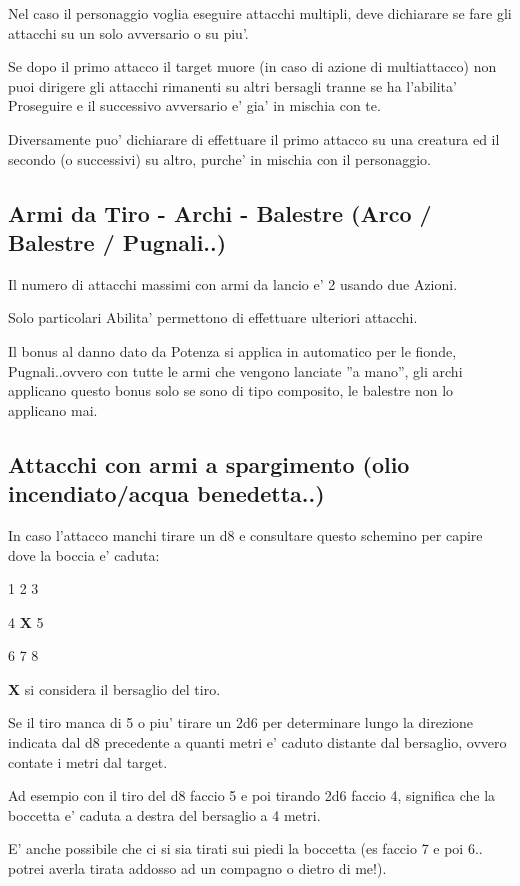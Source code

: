 \documentclass[a4paper,11pt,twoside,openany]{book}
\begin{document}
	Nel caso il personaggio voglia eseguire attacchi multipli, deve dichiarare se fare gli attacchi su un solo avversario o su piu'.
	
	Se dopo il primo attacco il target muore (in caso di azione di multiattacco) non puoi dirigere gli attacchi rimanenti su altri bersagli tranne se ha l'abilita' Proseguire e il successivo avversario e' gia' in mischia con te.
	
	Diversamente puo' dichiarare di effettuare il primo attacco su una creatura ed il secondo (o successivi) su altro, purche' in mischia con il personaggio.
	
	\subsection{Armi da Tiro - Archi - Balestre (Arco / Balestre / Pugnali..)}
	
	Il numero di attacchi massimi con armi da lancio e' 2 usando due Azioni.
	
	Solo particolari Abilita' permettono di effettuare ulteriori attacchi.
	
	Il bonus al danno dato da Potenza si applica in automatico per le fionde, Pugnali..ovvero con tutte le armi che vengono lanciate ''a mano'', gli archi applicano questo bonus solo se sono di tipo composito, le balestre non lo applicano mai.
	
	\subsection{Attacchi con armi a spargimento (olio incendiato/acqua benedetta..)}
	
	In caso l'attacco manchi tirare un d8 e consultare questo schemino per capire dove la boccia e' caduta:
	
	1 2 3
	
	4 \textbf{X} 5
	
	6 7 8
	
	\textbf{X} si considera il bersaglio del tiro.
	
	Se il tiro manca di 5 o piu' tirare un 2d6 per determinare lungo la direzione indicata dal d8 precedente a quanti metri e' caduto distante dal bersaglio, ovvero contate i metri dal target.
	
	Ad esempio con il tiro del d8 faccio 5 e poi tirando 2d6 faccio 4, significa che la boccetta e' caduta a destra del bersaglio a 4 metri.
	
	E' anche possibile che ci si sia tirati sui piedi la boccetta (es faccio 7 e poi 6.. potrei averla tirata addosso ad un compagno o dietro di me!).
	
\end{document}
